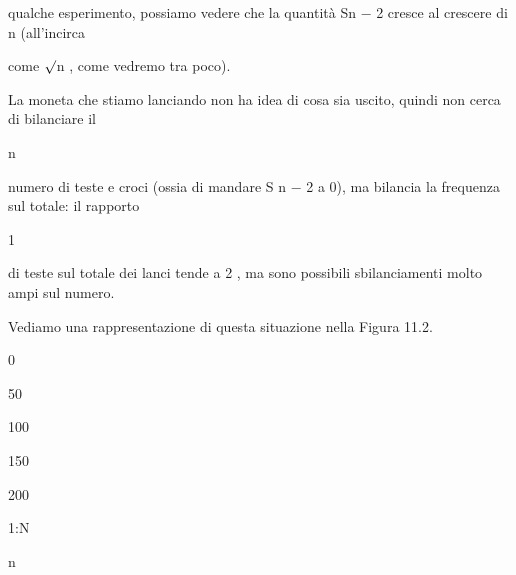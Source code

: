 \documentclass[a4paper,portrait,12pt]{article}
\begin{document}
\begin{flushleft}
qualche esperimento, possiamo vedere che la quantit\`{a} Sn $-$ 2 cresce al crescere di n (all'incirca
\end{flushleft}


\begin{flushleft}
come $\surd$n , come vedremo tra poco).
\end{flushleft}


\begin{flushleft}
La moneta che stiamo lanciando non ha idea di cosa sia uscito, quindi non cerca di bilanciare il
\end{flushleft}


\begin{flushleft}
n
\end{flushleft}


\begin{flushleft}
numero di teste e croci (ossia di mandare S n $-$ 2 a 0), ma bilancia la frequenza sul totale: il rapporto
\end{flushleft}


1


\begin{flushleft}
di teste sul totale dei lanci tende a 2 , ma sono possibili sbilanciamenti molto ampi sul numero.
\end{flushleft}


\begin{flushleft}
Vediamo una rappresentazione di questa situazione nella Figura 11.2.
\end{flushleft}





0





50





100





150





200





\begin{flushleft}
1:N
\end{flushleft}


\begin{flushleft}
n
\end{flushleft}
\end{document}
